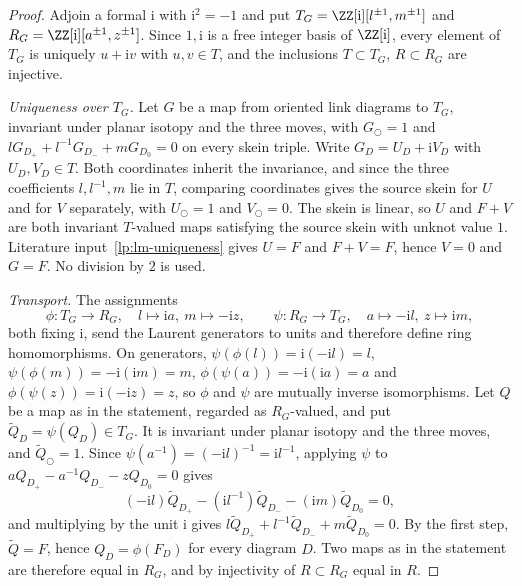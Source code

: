 \begin{proof}\leanok{}
Adjoin a formal $\mathrm i$ with $\mathrm i^2=-1$ and put
$T_G=\ZZ[\mathrm i][l^{\pm1},m^{\pm1}]$ and
$R_G=\ZZ[\mathrm i][a^{\pm1},z^{\pm1}]$. Since $1,\mathrm i$ is a free
integer basis of $\ZZ[\mathrm i]$, every element of $T_G$ is uniquely
$u+\mathrm iv$ with $u,v\in T$, and the inclusions $T\subset T_G$,
$R\subset R_G$ are injective.

\emph{Uniqueness over $T_G$.} Let $G$ be a map from oriented link diagrams
to $T_G$, invariant under planar isotopy and the three moves, with
$G_{\bigcirc}=1$ and $lG_{D_+}+l^{-1}G_{D_-}+mG_{D_0}=0$ on every skein
triple. Write $G_D=U_D+\mathrm iV_D$ with $U_D,V_D\in T$. Both coordinates
inherit the invariance, and since the three coefficients $l,l^{-1},m$ lie
in $T$, comparing coordinates gives the source skein for $U$ and for $V$
separately, with $U_{\bigcirc}=1$ and $V_{\bigcirc}=0$. The skein is linear,
so $U$ and $F+V$ are both invariant $T$-valued maps satisfying the source
skein with unknot value $1$. Literature input~\ref{lp:lm-uniqueness} gives
$U=F$ and $F+V=F$, hence $V=0$ and $G=F$. No division by $2$ is used.

\emph{Transport.} The assignments
\begin{equation}\label{lp:ring-transports}
 \phi:T_G\to R_G,\quad l\mapsto\mathrm ia,\ m\mapsto-\mathrm iz,
 \qquad
 \psi:R_G\to T_G,\quad a\mapsto-\mathrm il,\ z\mapsto\mathrm im,
\end{equation}
both fixing $\mathrm i$, send the Laurent generators to units and therefore
define ring homomorphisms. On generators,
$\psi(\phi(l))=\mathrm i(-\mathrm il)=l$,
$\psi(\phi(m))=-\mathrm i(\mathrm im)=m$,
$\phi(\psi(a))=-\mathrm i(\mathrm ia)=a$ and
$\phi(\psi(z))=\mathrm i(-\mathrm iz)=z$, so $\phi$ and $\psi$ are mutually
inverse isomorphisms. Let $Q$ be a map as in the statement, regarded as
$R_G$-valued, and put $\widetilde Q_D=\psi(Q_D)\in T_G$. It is invariant
under planar isotopy and the three moves, and
$\widetilde Q_{\bigcirc}=1$. Since $\psi(a^{-1})=(-\mathrm il)^{-1}
=\mathrm il^{-1}$, applying $\psi$ to
$aQ_{D_+}-a^{-1}Q_{D_-}-zQ_{D_0}=0$ gives
\begin{equation}\label{lp:transported-skein}
 (-\mathrm il)\widetilde Q_{D_+}-(\mathrm il^{-1})\widetilde Q_{D_-}
 -(\mathrm im)\widetilde Q_{D_0}=0,
\end{equation}
and multiplying by the unit $\mathrm i$ gives
$l\widetilde Q_{D_+}+l^{-1}\widetilde Q_{D_-}+m\widetilde Q_{D_0}=0$.
By the first step, $\widetilde Q=F$, hence $Q_D=\phi(F_D)$ for every
diagram $D$. Two maps as in the statement are therefore equal in $R_G$,
and by injectivity of $R\subset R_G$ equal in $R$.
\end{proof}

